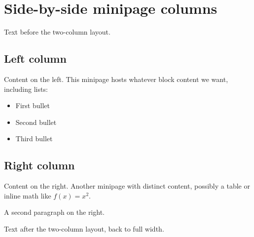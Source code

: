 \documentclass{article}
\begin{document}
\section{Side-by-side minipage columns}

Text before the two-column layout.

\noindent
\begin{minipage}[t]{0.48\textwidth}
\subsection*{Left column}
Content on the left. This minipage hosts whatever block content we want, including lists:
\begin{itemize}
  \item First bullet
  \item Second bullet
  \item Third bullet
\end{itemize}
\end{minipage}
\hfill
\begin{minipage}[t]{0.48\textwidth}
\subsection*{Right column}
Content on the right. Another minipage with distinct content, possibly a table or inline math like $f(x) = x^2$.

A second paragraph on the right.
\end{minipage}

Text after the two-column layout, back to full width.
\end{document}

